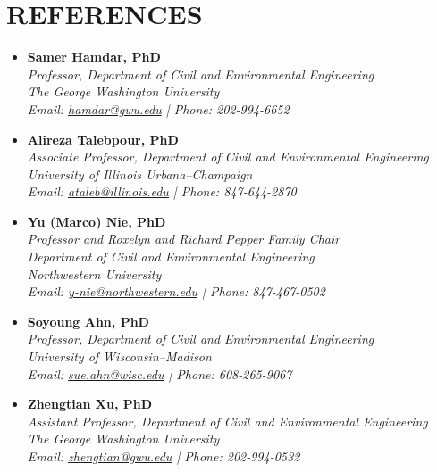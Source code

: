 \documentclass[letterpaper,11pt]{article}
\begin{document}
\section{REFERENCES}
\begin{itemize}
    \item \textbf{Samer Hamdar, PhD} \\
    {\small \textit{Professor, Department of Civil and Environmental Engineering}} \\ 
    {\small \textit{The George Washington University}} \\
    {\small \textit{Email: \href{mailto:hamdar@gwu.edu}{hamdar@gwu.edu} | Phone: 202-994-6652}}

    \item \textbf{Alireza Talebpour, PhD} \\
    {\small \textit{Associate Professor, Department of Civil and Environmental Engineering}} \\
    {\small \textit{University of Illinois Urbana–Champaign}} \\
    {\small \textit{Email: \href{mailto:ataleb@illinois.edu}{ataleb@illinois.edu} | Phone: 847-644-2870}}

    \item \textbf{Yu (Marco) Nie, PhD} \\
    {\small \textit{Professor and Roxelyn and Richard Pepper Family Chair}} \\
    {\small \textit{Department of Civil and Environmental Engineering}} \\
    {\small \textit{Northwestern University}} \\
    {\small \textit{Email: \href{mailto:y-nie@northwestern.edu}{y-nie@northwestern.edu} | Phone: 847-467-0502}}

    \item \textbf{Soyoung Ahn, PhD} \\
    {\small \textit{Professor, Department of Civil and Environmental Engineering}} \\
    {\small \textit{University of Wisconsin–Madison}} \\
    {\small \textit{Email: \href{mailto:sue.ahn@wisc.edu}{sue.ahn@wisc.edu} | Phone: 608-265-9067}}

    \item \textbf{Zhengtian Xu, PhD} \\
    {\small \textit{Assistant Professor, Department of Civil and Environmental Engineering}} \\ 
    {\small \textit{The George Washington University}} \\
    {\small \textit{Email: \href{mailto:zhengtian@gwu.edu}{zhengtian@gwu.edu} | Phone: 202-994-0532}}


\end{itemize}
\end{document}
